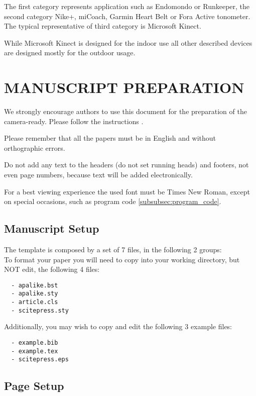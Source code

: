 \documentclass[a4paper,twoside]{article}
\begin{document}
The first category represents application such as Endomondo or Runkeeper, the second category Nike+, miCoach, Garmin Heart Belt or Fora Active tonometer. The typical representative of third category is Microsoft Kinect.

While Microsoft Kinect is designed for the indoor use all other described devices are designed mostly for the outdoor usage.

\section{\uppercase{Manuscript Preparation}}

\noindent We strongly encourage authors to use this document for the
preparation of the camera-ready. Please follow the instructions
\cite{Moore99}.

Please remember that all the papers must be in English and without
orthographic errors.

Do not add any text to the headers (do not set running heads) and
footers, not even page numbers, because text will be added
electronically.

For a best viewing experience the used font must be Times New
Roman, except on special occasions, such as program code
\ref{subsubsec:program_code}.


\subsection{Manuscript Setup}

\noindent The template is composed by a set of 7 files, in the
following 2 groups:\\
 To format your paper you will need to copy
into your working directory, but NOT edit, the following 4 files:
\begin{verbatim}
  - apalike.bst
  - apalike.sty
  - article.cls
  - scitepress.sty
\end{verbatim}

 Additionally, you may wish to copy and edit
the following 3 example files:
\begin{verbatim}
  - example.bib
  - example.tex
  - scitepress.eps
\end{verbatim}


\subsection{Page Setup}
\end{document}
